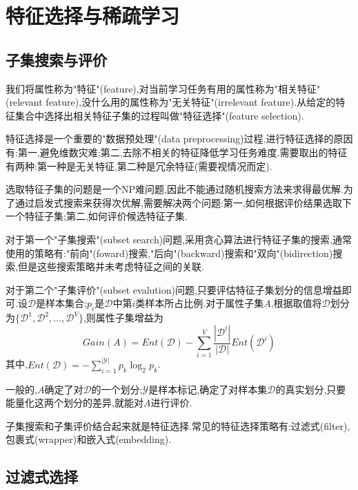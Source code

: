 \chapter{特征选择与稀疏学习}

\section{子集搜索与评价}

我们将属性称为"特征"(feature),对当前学习任务有用的属性称为"相关特征"(relevant feature),没什么用的属性称为"无关特征"(irrelevant feature).从给定的特征集合中选择出相关特征子集的过程叫做"特征选择"(feature selection).

特征选择是一个重要的"数据预处理"(data preprocessing)过程.进行特征选择的原因有:第一,避免维数灾难;第二,去除不相关的特征降低学习任务难度.需要取出的特征有两种:第一种是无关特征,第二种是冗余特征(需要视情况而定).

选取特征子集的问题是一个NP难问题,因此不能通过随机搜索方法来求得最优解.为了通过启发式搜索来获得次优解,需要解决两个问题:第一,如何根据评价结果选取下一个特征子集;第二,如何评价候选特征子集.

对于第一个"子集搜索"(subset search)问题,采用贪心算法进行特征子集的搜索,通常使用的策略有:"前向"(foward)搜索,"后向"(backward)搜索和"双向"(bidirection)搜索,但是这些搜索策略并未考虑特征之间的关联.

对于第二个"子集评价"(subset evalution)问题,只要评估特征子集划分的信息增益即可.设$\mathcal{D}$是样本集合;$p_i$是$\mathcal{D}$中第$i$类样本所占比例.对于属性子集$A$,根据取值将$\mathcal{D}$划分为$\{\mathcal{D}^1,\mathcal{D}^2,\dots,\mathcal{D}^V\}$,则属性子集增益为
\begin{equation}
Gain(A)=Ent(\mathcal{D})-\sum_{i=1}^V\frac{|\mathcal{D}^i|}{|\mathcal{D}|}Ent(\mathcal{D}^i)
\end{equation}
其中,$Ent(\mathcal{D})=-\sum_{i=1}^{|\mathcal{Y}|}p_k\log_2p_k$.

一般的,$A$确定了对$\mathcal{D}$的一个划分;$\mathcal{Y}$是样本标记,确定了对样本集$\mathcal{D}$的真实划分,只要能量化这两个划分的差异,就能对$A$进行评价.

子集搜索和子集评价结合起来就是特征选择.常见的特征选择策略有:过滤式(filter),包裹式(wrapper)和嵌入式(embedding).

\section{过滤式选择}

